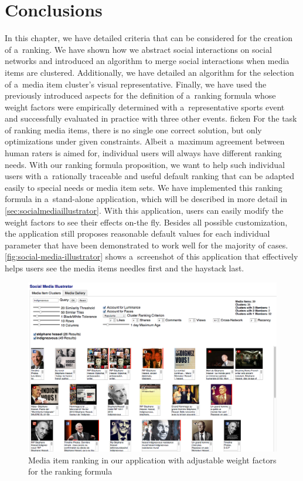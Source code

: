 \section{Conclusions}

In this chapter, we have detailed criteria
that can be considered for the creation of a~ranking.
We have shown how we abstract social interactions on social networks
and introduced an algorithm to merge social interactions
when media items are clustered.
Additionally, we have detailed an algorithm
for the selection of a~media item cluster's visual representative.
Finally, we have used the previously introduced aspects
for the definition of a~ranking formula
whose weight factors were empirically determined
with a~representative sports event
and successfully evaluated in practice with three other events.
ficken
For the task of ranking media items, there is no single one correct solution,
but only optimizations under given constraints.
Albeit a~maximum agreement between human raters is aimed for,
individual users will always have different ranking needs.
With our ranking formula proposition, we want to help
such individual users with a~rationally traceable and useful default ranking
that can be adapted easily to special needs or media item sets.
We have implemented this ranking formula in a~stand-alone application,%
which will be described in more detail in \autoref{sec:socialmediaillustrator}.
With this application,
users can easily modify the weight factors
to see their effects on-the fly.
Besides all possible customization,
the application still proposes reasonable default values
for each individual parameter that have been demonstrated
to work well for the majority of cases.
\autoref{fig:social-media-illustrator} shows a~screenshot of this application
that effectively helps users see the media items needles first
and the haystack last.

\begin{figure}[!ht]
  \centering
  \includegraphics[width=1.0\linewidth]{social-media-illustrator.png}
  \caption[Media item ranking in our application with adjustable weight factors]
  {Media item ranking in our application with adjustable weight factors for the ranking formula}
  \label{fig:social-media-illustrator}
\end{figure}


